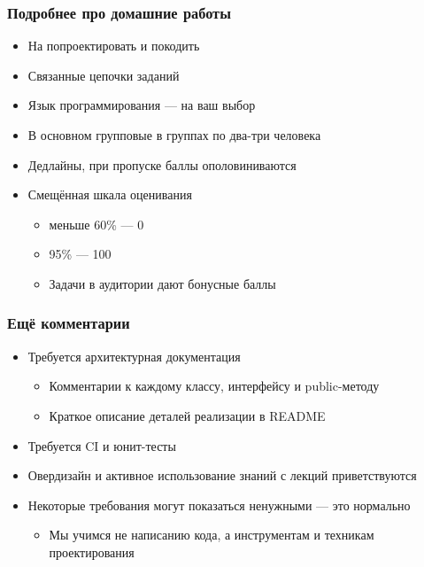\documentclass{../mcsslides}
\begin{document}
    \begin{frame}
        \frametitle{Подробнее про домашние работы}
        \begin{itemize}
            \item На попроектировать и покодить
            \item Связанные цепочки заданий
            \item Язык программирования --- на ваш выбор
            \item В основном групповые в группах по два-три человека
            \item Дедлайны, при пропуске баллы ополовиниваются
            \item Смещённая шкала оценивания 
            \begin{itemize}
                \item меньше 60\% --- 0
                \item 95\% --- 100
                \item Задачи в аудитории дают бонусные баллы
            \end{itemize} 
        \end{itemize}
    \end{frame}

    \begin{frame}
        \frametitle{Ещё комментарии}
        \begin{itemize}
            \item Требуется архитектурная документация
            \begin{itemize}
                \item Комментарии к каждому классу, интерфейсу и public-методу
                \item Краткое описание деталей реализации в README
            \end{itemize}
            \item Требуется CI и юнит-тесты
            \item Овердизайн и активное использование знаний с лекций приветствуются
            \item Некоторые требования могут показаться ненужными --- это нормально
            \begin{itemize}
                \item Мы учимся не написанию кода, а инструментам и техникам проектирования
            \end{itemize}
        \end{itemize}
    \end{frame}
\end{document}
